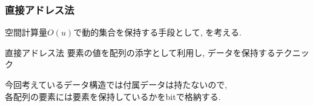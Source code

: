 \documentclass[main]{subfiles}
\begin{document}
\begin{frame}\frametitle{直接アドレス法}
	空間計算量$O(u)$で動的集合を保持する手段として, を考える.\\
\begin{block}{直接アドレス法}
	要素の値を配列の添字として利用し, データを保持するテクニック
\end{block}
今回考えているデータ構造では付属データは持たないので, \\各配列の要素には要素を保持しているかをbitで格納する.

\end{frame}
\end{document}
